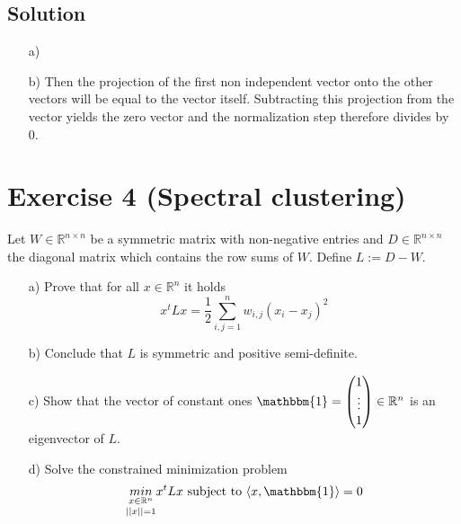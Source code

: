 \documentclass[10pt]{article}
\numberwithin{equation}{section}
\begin{document}
\subsection*{Solution}
\begin{enumerate}
\item[a)]{
  }
\item[b)]{
    Then the projection of the first non independent vector onto the other vectors will be equal to the vector itself. Subtracting this projection from the vector yields the zero vector and the normalization step therefore divides by 0.
  }
\end{enumerate}

\section*{Exercise 4 (Spectral clustering)}
Let $W \in \mathbb{R}^{n\times n}$ be a symmetric matrix with non-negative entries and $D \in \mathbb{R}^{n\times n}$ the diagonal matrix which contains the row sums of $W$. Define $L := D - W$.


\begin{enumerate}
\item[a)]{
    Prove that for all $x \in \mathbb{R}^n$ it holds
    $$ x^t Lx = \frac{1}{2} \sum_{i,j=1}^n w_{i,j} (x_i - x_j)^2$$
  }
\item[b)]{
    Conclude that $L$ is symmetric and positive semi-definite.
  }
\item[c)]{
    Show that the vector of constant ones $\mathbbm{1} = \begin{pmatrix} 1 \\ \vdots \\ 1\end{pmatrix} \in \mathbb{R}^n$ is an eigenvector of $L$.
  }
\item[d)]{
  Solve the constrained minimization problem
  $$\underset{||x|| = 1}{\underset{x\in \mathbb{R}^n}{min}} x^t Lx \text{ subject to }\langle x, \mathbbm{1} \rangle = 0$$
}
\end{enumerate}
\end{document}
